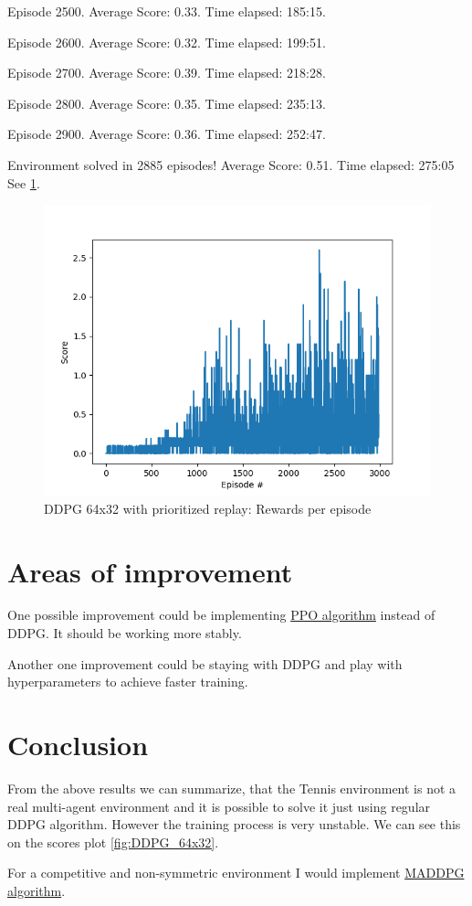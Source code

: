 \documentclass{report}
\begin{document}
Episode 2500.	Average Score: 0.33.	Time elapsed: 185:15.

Episode 2600.	Average Score: 0.32.	Time elapsed: 199:51.

Episode 2700.	Average Score: 0.39.	Time elapsed: 218:28.

Episode 2800.	Average Score: 0.35.	Time elapsed: 235:13.

Episode 2900.	Average Score: 0.36.	Time elapsed: 252:47.

Environment solved in 2885 episodes!	Average Score: 0.51.	Time elapsed: 275:05 See \ref{fig:DDPG_64x32_pri}.

\begin{figure}
	\includegraphics[width=0.9\linewidth]{res/ddpg_64x32_2/score.png}
	\caption{DDPG 64x32 with prioritized replay: Rewards per episode}
	\label{fig:DDPG_64x32_pri}
\end{figure}


\section*{Areas of improvement}

One possible improvement could be implementing \href{https://arxiv.org/pdf/1707.06347.pdf}{PPO algorithm} instead of DDPG. It should be working more stably.

Another one improvement could be staying with DDPG and play with hyperparameters to achieve faster training.


\section*{Conclusion}

From the above results we can summarize, that the Tennis environment is not a real multi-agent environment and it is possible to solve it just using regular DDPG algorithm. However the training process is very unstable. We can see this on the scores plot \ref{fig:DDPG_64x32}.

For a competitive and non-symmetric environment I would implement \href{https://arxiv.org/pdf/1706.02275.pdf}{MADDPG algorithm}.
\end{document}
